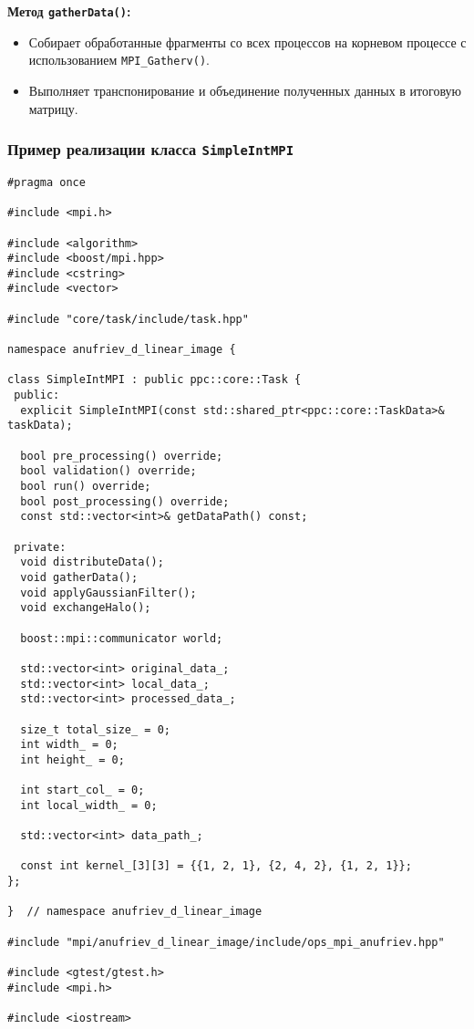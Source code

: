 \documentclass[12pt]{article}
\begin{document}
\textbf{Метод \texttt{gatherData()}:}
\begin{itemize}
    \item Собирает обработанные фрагменты со всех процессов на корневом процессе с использованием \texttt{MPI\_Gatherv()}.
    \item Выполняет транспонирование и объединение полученных данных в итоговую матрицу.
\end{itemize}

\subsubsection{Пример реализации класса \texttt{SimpleIntMPI}}
\begin{lstlisting}
#pragma once

#include <mpi.h>

#include <algorithm>
#include <boost/mpi.hpp>
#include <cstring>
#include <vector>

#include "core/task/include/task.hpp"

namespace anufriev_d_linear_image {

class SimpleIntMPI : public ppc::core::Task {
 public:
  explicit SimpleIntMPI(const std::shared_ptr<ppc::core::TaskData>& taskData);

  bool pre_processing() override;
  bool validation() override;
  bool run() override;
  bool post_processing() override;
  const std::vector<int>& getDataPath() const;

 private:
  void distributeData();
  void gatherData();
  void applyGaussianFilter();
  void exchangeHalo();

  boost::mpi::communicator world;

  std::vector<int> original_data_;
  std::vector<int> local_data_;
  std::vector<int> processed_data_;

  size_t total_size_ = 0;
  int width_ = 0;
  int height_ = 0;

  int start_col_ = 0;
  int local_width_ = 0;

  std::vector<int> data_path_;

  const int kernel_[3][3] = {{1, 2, 1}, {2, 4, 2}, {1, 2, 1}};
};

}  // namespace anufriev_d_linear_image

#include "mpi/anufriev_d_linear_image/include/ops_mpi_anufriev.hpp"

#include <gtest/gtest.h>
#include <mpi.h>

#include <iostream>


\end{lstlisting}
\end{document}
